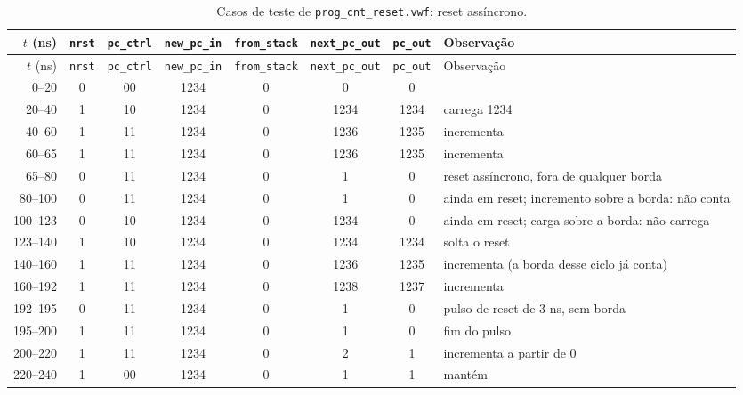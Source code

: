 {\scriptsize\setlength{\tabcolsep}{3pt}
\begin{longtable}{rccccccp{4.2cm}}
\caption{Casos de teste de \texttt{prog\_cnt\_reset.vwf}: reset assíncrono.}
\label{tab:caso-prog-cnt-reset}\\
\hline $t$ (ns) & \texttt{nrst} & \texttt{pc\_ctrl} & \texttt{new\_pc\_in} & \texttt{from\_stack} & \texttt{next\_pc\_out} & \texttt{pc\_out} & Observação \\ \hline \endfirsthead
\hline $t$ (ns) & \texttt{nrst} & \texttt{pc\_ctrl} & \texttt{new\_pc\_in} & \texttt{from\_stack} & \texttt{next\_pc\_out} & \texttt{pc\_out} & Observação \\ \hline \endhead
0--20 & 0 & 00 & 1234 & 0 & 0 & 0 &  \\
20--40 & 1 & 10 & 1234 & 0 & 1234 & 1234 & carrega 1234 \\
40--60 & 1 & 11 & 1234 & 0 & 1236 & 1235 & incrementa \\
60--65 & 1 & 11 & 1234 & 0 & 1236 & 1235 & incrementa \\
65--80 & 0 & 11 & 1234 & 0 & 1 & 0 & reset assíncrono, fora de qualquer borda \\
80--100 & 0 & 11 & 1234 & 0 & 1 & 0 & ainda em reset; incremento sobre a borda: não conta \\
100--123 & 0 & 10 & 1234 & 0 & 1234 & 0 & ainda em reset; carga sobre a borda: não carrega \\
123--140 & 1 & 10 & 1234 & 0 & 1234 & 1234 & solta o reset \\
140--160 & 1 & 11 & 1234 & 0 & 1236 & 1235 & incrementa (a borda desse ciclo já conta) \\
160--192 & 1 & 11 & 1234 & 0 & 1238 & 1237 & incrementa \\
192--195 & 0 & 11 & 1234 & 0 & 1 & 0 & pulso de reset de 3 ns, sem borda \\
195--200 & 1 & 11 & 1234 & 0 & 1 & 0 & fim do pulso \\
200--220 & 1 & 11 & 1234 & 0 & 2 & 1 & incrementa a partir de 0 \\
220--240 & 1 & 00 & 1234 & 0 & 1 & 1 & mantém \\
\hline
\end{longtable}}
\vspace{-0.9cm}
